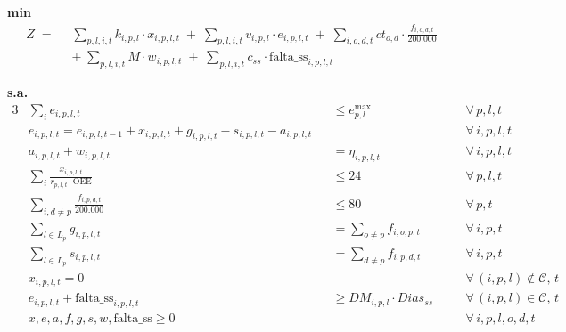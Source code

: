 \documentclass[12pt, a4paper]{article}
\begin{document}
\begin{mdframed}[backgroundcolor=blue!5, linecolor=ballblue, linewidth=2pt,
  innertopmargin=14pt, innerbottommargin=14pt,
  innerleftmargin=14pt, innerrightmargin=14pt]

\textbf{\color{ballblue}min}
\vspace{-5pt}
\[
  \begin{aligned}
    Z \;=\;\;
    & \sum_{p,l,i,t} k_{i,p,l} \cdot x_{i,p,l,t}
      \;+\; \sum_{p,l,i,t} v_{i,p,l} \cdot e_{i,p,l,t}
      \;+\; \sum_{i,o,d,t} ct_{o,d} \cdot \tfrac{f_{i,o,d,t}}{200{.}000} \\
      & +\; \sum_{p,l,i,t} M \cdot w_{i,p,l,t}
      \;+\; \sum_{p,l,i,t} c_{ss} \cdot \text{falta\_ss}_{i,p,l,t}
  \end{aligned}
\]

\textbf{\color{ballblue}s.a.}
\vspace{-15pt}
\begin{alignat}{3}
  &\textstyle\sum_{i} e_{i,p,l,t}
    &&\leq e^{\max}_{p,l}
    &&\quad\forall\,p,l,t \tag{R1}\\[4pt]
  &e_{i,p,l,t} = e_{i,p,l,t-1} + x_{i,p,l,t} + g_{i,p,l,t} - s_{i,p,l,t} - a_{i,p,l,t}
    &&
    &&\quad\forall\,i,p,l,t \tag{R2}\\[4pt]
  &a_{i,p,l,t} + w_{i,p,l,t}
    &&= \eta_{i,p,l,t}
    &&\quad\forall\,i,p,l,t \tag{R3}\\[4pt]
  &\textstyle\sum_{i} \tfrac{x_{i,p,l,t}}{r_{p,l,t}\cdot \text{OEE}}
    &&\leq 24
    &&\quad\forall\,p,l,t \tag{R4}\\[4pt]
  &\textstyle\sum_{i,d\neq p} \tfrac{f_{i,p,d,t}}{200{.}000}
    &&\leq 80
    &&\quad\forall\,p,t \tag{R5}\\[4pt]
  &\textstyle\sum_{l \in L_p} g_{i,p,l,t}
    &&= \textstyle\sum_{o \neq p} f_{i,o,p,t}
    &&\quad\forall\,i,p,t \tag{R6}\\[4pt]
  &\textstyle\sum_{l \in L_p} s_{i,p,l,t}
    &&= \textstyle\sum_{d \neq p} f_{i,p,d,t}
    &&\quad\forall\,i,p,t \tag{R7}\\[4pt]
  &x_{i,p,l,t} = 0
    &&
    &&\quad\forall\,(i,p,l)\notin\mathcal{C},\,t \tag{R8}\\[4pt]
  &e_{i,p,l,t} + \text{falta\_ss}_{i,p,l,t}
    &&\geq DM_{i,p,l} \cdot Dias_{ss}
    &&\quad\forall\,(i,p,l)\in\mathcal{C},\,t \tag{R10}\\[4pt]
  &x,e,a,f,g,s,w,\text{falta\_ss} \geq 0
    &&
    &&\quad\forall\,i,p,l,o,d,t \tag{R9}
\end{alignat}
\end{mdframed}
\end{document}
